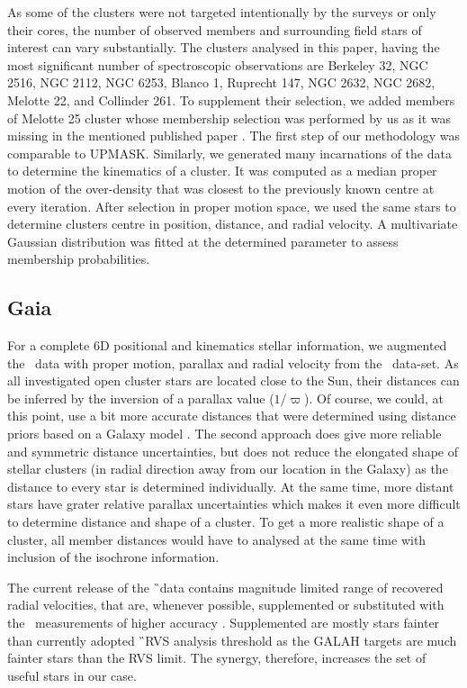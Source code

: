 As some of the clusters were not targeted intentionally by the surveys or only their cores, the number of observed members and surrounding field stars of interest can vary substantially. The clusters analysed in this paper, having the most significant number of spectroscopic observations are Berkeley 32, NGC 2516, NGC 2112, NGC 6253, Blanco 1, Ruprecht 147, NGC 2632, NGC 2682,  Melotte 22, and Collinder 261. To supplement their selection, we added members of Melotte 25 cluster whose membership selection was performed by us as it was missing in the mentioned published paper \cite{2018A&A...618A..93C}. The first step of our methodology was comparable to UPMASK. Similarly, we generated many incarnations of the data to determine the kinematics of a cluster. It was computed as a median proper motion of the over-density that was closest to the previously known centre at every iteration. After selection in proper motion space, we used the same stars to determine clusters centre in position, distance, and radial velocity. A multivariate Gaussian distribution was fitted at the determined parameter to assess membership probabilities.

\subsection{Gaia}
\label{sec:gaia_clusters}
For a complete 6D positional and kinematics stellar information, we augmented the \Gh\ data with proper motion, parallax and radial velocity from the \Gs\ data-set. As all investigated open cluster stars are located close to the Sun, their distances can be inferred by the inversion of a parallax value ($1 / \varpi$). Of course, we could, at this point, use a bit more accurate distances that were determined using distance priors based on a Galaxy model \cite{2018AJ....156...58B}. The second approach does give more reliable and symmetric distance uncertainties, but does not reduce the elongated shape of stellar clusters (in radial direction away from our location in the Galaxy) as the distance to every star is determined individually. At the same time, more distant stars have grater relative parallax uncertainties which makes it even more difficult to determine distance and shape of a cluster. To get a more realistic shape of a cluster, all member distances would have to analysed at the same time with inclusion of the isochrone information.

The current release of the \G\ data contains magnitude limited range of recovered radial velocities, that are, whenever possible, supplemented or substituted with the \Gh\ measurements of higher accuracy \cite{2018arXiv180406344Z}. Supplemented are mostly stars fainter than currently adopted \G\ RVS \cite{2018A&A...616A...5C} analysis threshold as the GALAH targets are much fainter stars than the RVS limit. The synergy, therefore, increases the set of useful stars in our case.

